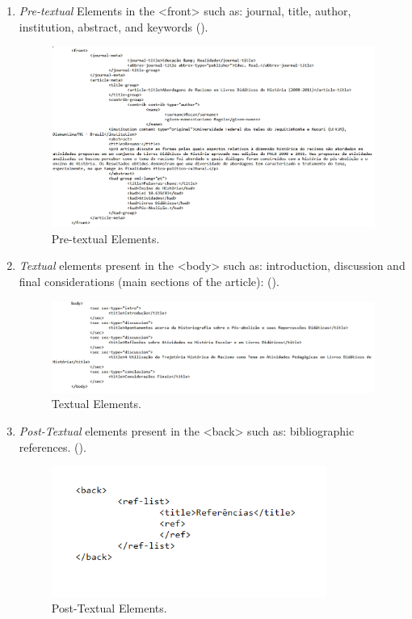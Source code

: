 \documentclass[english]{textolivre}
\begin{document}
\begin{enumerate}
    \item \textit{Pre-textual} Elements in the <front> such as: journal, title, author, institution, abstract, and keywords ().
\begin{figure}[htbp]
 \centering
 \includegraphics[width=\textwidth]{Fig14.png}
 \caption{Pre-textual Elements.}
 \label{fig-14}
\end{figure}
    \item \textit{Textual} elements present in the <body> such as: introduction, discussion and final considerations (main sections of the article): ().
\begin{figure}[htbp]
\centering
\includegraphics[width=\textwidth]{Fig15.png}
\caption{Textual Elements.}
\label{fig-15}
\end{figure}
    \item \textit{Post-Textual} elements present in the <back> such as: bibliographic references. ().
\begin{figure}[htbp]
\centering
\includegraphics[width=0.85\textwidth]{Fig16.png}
\caption{Post-Textual Elements.}
\label{fig-16}
\end{figure}
\end{enumerate}
\end{document}
